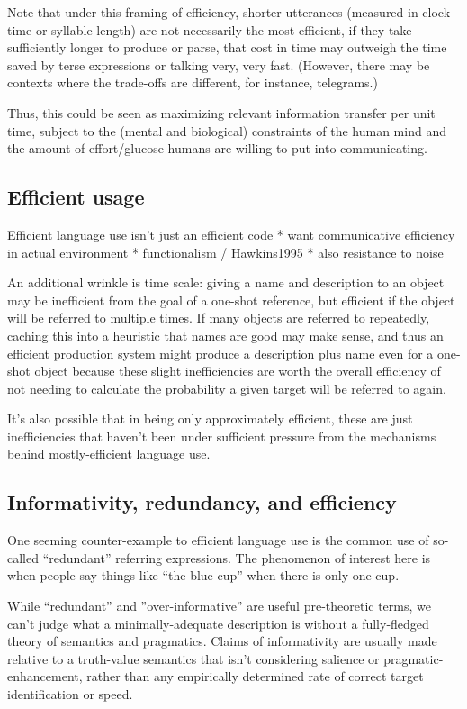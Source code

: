 \documentclass[]{article}
\begin{document}
Note that under this framing of efficiency, shorter utterances (measured in clock time or syllable length) are not necessarily the most efficient, if they take sufficiently longer to produce or parse, that cost in time may outweigh the time saved by terse expressions or talking very, very fast. (However, there may be contexts where the trade-offs are different, for instance, telegrams.)

Thus, this could be seen as maximizing relevant information transfer per unit time, subject to the (mental and biological) constraints of the human mind and the amount of effort/glucose humans are willing to put into communicating. 


\subsection{Efficient usage}
Efficient language use isn't just an efficient code
* want communicative efficiency in actual environment
* functionalism / Hawkins1995
* also resistance to noise 

An additional wrinkle is time scale: giving a name and description to an object may be inefficient from the goal of a one-shot reference, but efficient if the object will be referred to multiple times. If many objects are referred to repeatedly, caching this into a heuristic that names are good may make sense, and thus an efficient production system might produce a description plus name even for a one-shot object because these slight inefficiencies are worth the overall efficiency of not needing to calculate the probability a given target will be referred to again. 

It's also possible that in being only approximately efficient, these are just inefficiencies that haven't been under sufficient pressure from the mechanisms behind mostly-efficient language use. 

\subsection{Informativity, redundancy, and efficiency}
One seeming counter-example to efficient language use is the common use of so-called ``redundant'' referring expressions. The phenomenon of interest here is when people say things like ``the blue cup'' when there is only one cup.  

While ``redundant'' and ''over-informative'' are useful pre-theoretic terms, we can't judge what a minimally-adequate description is without a fully-fledged theory of semantics and pragmatics. Claims of informativity are usually made relative to a truth-value semantics that isn't considering salience or pragmatic-enhancement, rather than any empirically determined rate of correct target identification or speed. 
\end{document}
